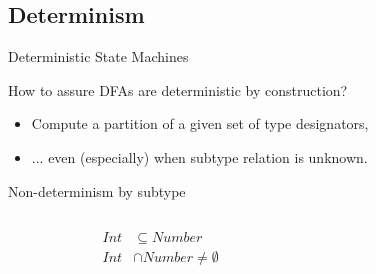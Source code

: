 \subsection{Determinism}

{  %
\begin{frame}{ Deterministic State Machines}

  How to assure DFAs are deterministic by construction?

  \begin{itemize}
  \item   Compute a partition of a given set of type designators,
  \item   ... even (especially) when subtype relation is unknown.
  \end{itemize}

\end{frame}
}


  



\begin{frame}{Non-determinism by subtype}
  \begin{columns}[T]
    \begin{column}{0.4\textwidth}
      \centering
      
      \begin{align*}
        Int&\subseteq Number\\
        Int &\cap Number \neq \emptyset
      \end{align*}%
      \scalebox{0.8}{}%
    \end{column}%
    \begin{column}{0.6\textwidth}
      \only<2>{\scalebox{0.8}{}}%
    \end{column}
  \end{columns}
\end{frame}



